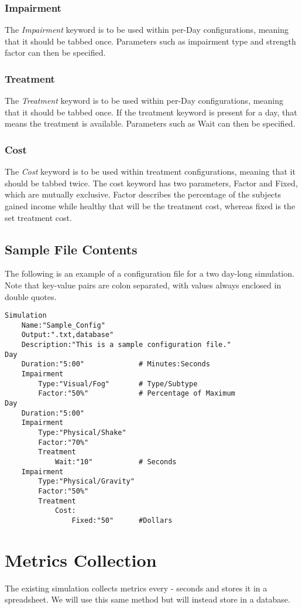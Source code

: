 \documentclass{article}
\begin{document}
\subsubsection*{Impairment}

The \textit{Impairment} keyword is to be used within per-Day configurations, meaning that it should be tabbed once. Parameters such as impairment type and strength factor can then be specified. 
\subsubsection*{Treatment}

The \textit{Treatment} keyword is to be used within per-Day configurations, meaning that it should be tabbed once. If the treatment keyword is present for a day, that means the treatment is available. Parameters such as Wait can then be specified.

\subsubsection*{Cost}

The \textit{Cost} keyword is to be used within treatment configurations, meaning that it should be tabbed twice. The cost keyword has two parameters, Factor and Fixed, which are mutually exclusive. Factor describes the percentage of the subjects gained income while healthy that will be the treatment cost, whereas fixed is the set treatment cost.

\subsection*{Sample File Contents}
The following is an example of a configuration file for a two day-long simulation. Note that key-value pairs are colon separated, with values always enclosed in double quotes. 

\begin{lstlisting}
Simulation
    Name:"Sample_Config"
    Output:".txt,database"
    Description:"This is a sample configuration file."	
Day
    Duration:"5:00"             # Minutes:Seconds
    Impairment
        Type:"Visual/Fog"       # Type/Subtype
        Factor:"50%"            # Percentage of Maximum
Day
    Duration:"5:00"
    Impairment
        Type:"Physical/Shake"
        Factor:"70%"
        Treatment
            Wait:"10"           # Seconds
    Impairment
        Type:"Physical/Gravity"
        Factor:"50%"
        Treatment
            Cost:
                Fixed:"50"      #Dollars
\end{lstlisting}


\section*{Metrics Collection}

The existing simulation collects metrics every - seconds and stores it in a spreadsheet. We will use this same method but will instead store in a database.



\end{document}
